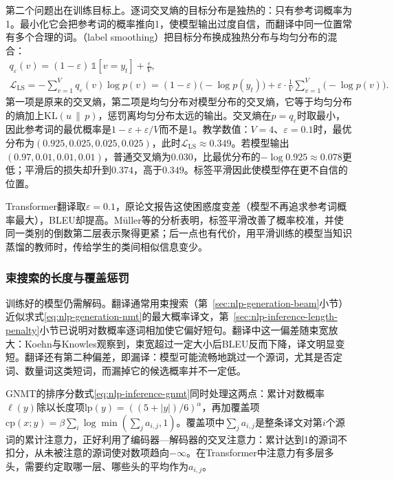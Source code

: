 第二个问题出在训练目标上。逐词交叉熵的目标分布是独热的：只有参考词概率为1。最小化它会把参考词的概率推向1，使模型输出过度自信，而翻译中同一位置常有多个合理的词。（label smoothing）把目标分布换成独热分布与均匀分布的混合\cite{nlp-gen-szegedy2016inception}：
\begin{equation}
  \begin{gathered}
  q_\varepsilon(v)=(1-\varepsilon)\,\mathbb 1[v=y_t]+\frac{\varepsilon}{V},\\
  \mathcal L_{\mathrm{LS}}=-\sum_{v=1}^{V}q_\varepsilon(v)\log p(v)
  =(1-\varepsilon)\bigl(-\log p(y_t)\bigr)+\varepsilon\cdot\frac1V\sum_{v=1}^{V}\bigl(-\log p(v)\bigr).
  \end{gathered}
  \label{eq:nlp-generation-label-smoothing}
\end{equation}
第一项是原来的交叉熵，第二项是均匀分布对模型分布的交叉熵，它等于均匀分布的熵加上$\mathrm{KL}(u\,\|\,p)$，惩罚离均匀分布太远的输出。交叉熵在$p=q_\varepsilon$时取最小，因此参考词的最优概率是$1-\varepsilon+\varepsilon/V$而不是1。教学数值：$V=4$、$\varepsilon=0.1$时，最优分布为$(0.925,0.025,0.025,0.025)$，此时$\mathcal L_{\mathrm{LS}}\approx0.349$。若模型输出$(0.97,0.01,0.01,0.01)$，普通交叉熵为$0.030$，比最优分布的$-\log0.925\approx0.078$更低；平滑后的损失却升到$0.374$，高于$0.349$。标签平滑因此使模型停在更不自信的位置。

Transformer翻译取$\varepsilon=0.1$，原论文报告这使困惑度变差（模型不再追求参考词概率最大），BLEU却提高。Müller等的分析表明，标签平滑改善了概率校准，并使同一类别的倒数第二层表示聚得更紧；后一点也有代价，用平滑训练的模型当知识蒸馏的教师时，传给学生的类间相似信息变少。

\subsubsection{束搜索的长度与覆盖惩罚}
\label{sec:nlp-generation-mt-beam-penalty}

训练好的模型仍需解码。翻译通常用束搜索（第~\ref{sec:nlp-generation-beam}小节）近似求式\eqref{eq:nlp-generation-nmt}的最大概率译文，第~\ref{sec:nlp-inference-length-penalty}小节已说明对数概率逐词相加使它偏好短句。翻译中这一偏差随束宽放大：Koehn与Knowles观察到，束宽超过一定大小后BLEU反而下降，译文明显变短。翻译还有第二种偏差，即漏译：模型可能流畅地跳过一个源词，尤其是否定词、数量词这类短词，而漏掉它的候选概率并不一定低。

GNMT的排序分数式\eqref{eq:nlp-inference-gnmt}同时处理这两点\cite{nlp-inference-wu2016gnmt}：累计对数概率$\ell(y)$除以长度项$\mathrm{lp}(y)=((5+|y|)/6)^{\alpha}$，再加覆盖项$\mathrm{cp}(x;y)=\beta\sum_i\log\min(\sum_ja_{i,j},1)$。覆盖项中$\sum_ja_{i,j}$是整条译文对第$i$个源词的累计注意力，正好利用了编码器—解码器的交叉注意力：累计达到1的源词不扣分，从未被注意的源词使对数项趋向$-\infty$。在Transformer中注意力有多层多头，需要约定取哪一层、哪些头的平均作为$a_{i,j}$。

